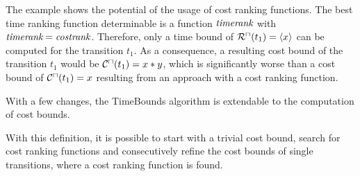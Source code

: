 The example shows the potential of the usage of cost ranking functions.
The best time ranking function determinable is a function $\emph{timerank}$ with $\emph{timerank} = \emph{costrank}$.
Therefore, only a time bound of ${\mathcal{R}^\sqcap}(t_1) = \langle x\rangle$ can be computed for the transition $t_1$.
As a consequence, a resulting cost bound of the transition $t_1$ would be ${\mathcal{C}^\sqcap}(t_1) = x*y$, which is significantly worse than a cost bound of ${\mathcal{C}^\sqcap}(t_1) = x$ resulting from an approach with a cost ranking function.

With a few changes, the TimeBounds algorithm is extendable to the computation of cost bounds.



With this definition, it is possible to start with a trivial cost bound, search for cost ranking functions and consecutively refine the cost bounds of single transitions, where a cost ranking function is found.
